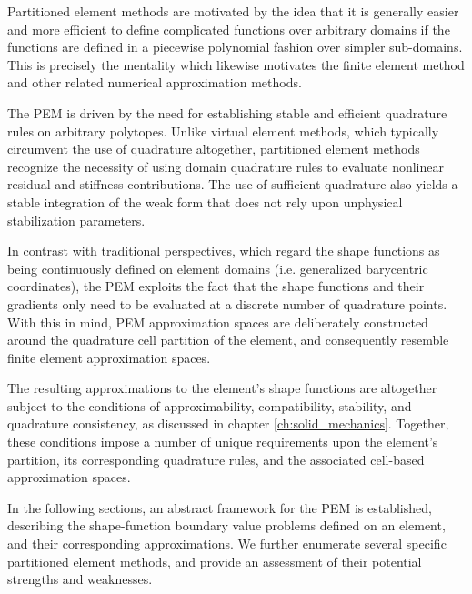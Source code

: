 Partitioned element methods are motivated by the idea that it is generally easier and more efficient to define complicated functions over arbitrary domains if the functions are defined in a piecewise polynomial fashion over simpler sub-domains. This is precisely the mentality which likewise motivates the finite element method and other related numerical approximation methods.

The PEM is driven by the need for establishing stable and efficient quadrature rules on arbitrary polytopes. Unlike virtual element methods, which typically circumvent the use of quadrature altogether, partitioned element methods recognize the necessity of using domain quadrature rules to evaluate nonlinear residual and stiffness contributions. The use of sufficient quadrature also yields a stable integration of the weak form that does not rely upon unphysical stabilization parameters.

In contrast with traditional perspectives, which regard the shape functions as being continuously defined on element domains (i.e. generalized barycentric coordinates), the PEM exploits the fact that the shape functions and their gradients only need to be evaluated at a discrete number of quadrature points. With this in mind, PEM approximation spaces are deliberately constructed around the quadrature cell partition of the element, and consequently resemble finite element approximation spaces.

The resulting approximations to the element's shape functions are altogether subject to the conditions of approximability, compatibility, stability, and quadrature consistency, as discussed in chapter \ref{ch:solid_mechanics}. Together, these conditions impose a number of unique requirements upon the element's partition, its corresponding quadrature rules, and the associated cell-based approximation spaces.

In the following sections, an abstract framework for the PEM is established, describing the shape-function boundary value problems defined on an element, and their corresponding approximations. We further enumerate several specific partitioned element methods, and provide an assessment of their potential strengths and weaknesses.


